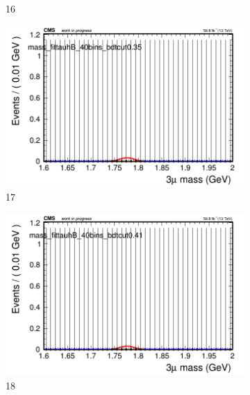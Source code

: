 \begin{figure}[h!]
\begin{subfigure}{0.2\textwidth}
        \caption{16}
    \end{subfigure}
    \begin{subfigure}{0.2\textwidth}
        \includegraphics[width=\textwidth]{power_law/plots/tauhB/massfit_tauhB_40bins_bdtcut0.35.png}
        \caption{17}
    \end{subfigure}
    \begin{subfigure}{0.2\textwidth}
        \includegraphics[width=\textwidth]{power_law/plots/tauhB/massfit_tauhB_40bins_bdtcut0.41.png}
        \caption{18}
    \end{subfigure}
    \begin{subfigure}{0.2\textwidth}

\end{subfigure}
\end{figure}
